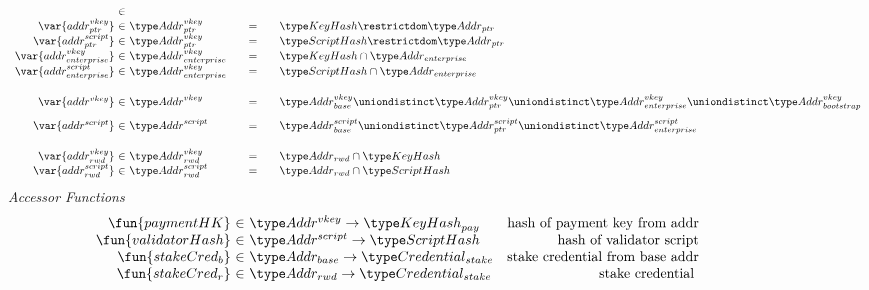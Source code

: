 \begin{figure*}[hbt]
\begin{equation*}
\begin{array}{r@{~\in~}l@{\qquad=\qquad}lr}
      \\
      \var{addr^{vkey}_{ptr}}
                 & \Addr^{vkey}_{ptr}
                               & \KeyHash\restrictdom\Addr_{ptr}
      \\
      \var{addr^{script}_{ptr}}
                 & \Addr^{vkey}_{ptr}
                               & \HashScr\restrictdom\Addr_{ptr}
      \\
      \var{addr^{vkey}_{enterprise}}
                 & \Addr^{vkey}_{enterprise}
                               & \KeyHash\cap\Addr_{enterprise}
      \\
      \var{addr^{script}_{enterprise}}
                 & \Addr^{vkey}_{enterprise}
                               & \HashScr\cap\Addr_{enterprise}
      \\[0.5cm]
      \var{addr^{vkey}} &
             \Addr^{vkey} &
                            \Addr^{vkey}_{base} \uniondistinct \Addr^{vkey}_{ptr} \uniondistinct \Addr^{vkey}_{enterprise} \uniondistinct \Addr^{vkey}_{bootstrap}\\[0.3cm]
      \var{addr^{script}} &
                            \Addr^{script} &
                                             \Addr^{script}_{base}
                                             \uniondistinct \Addr^{script}_{ptr}
                                             \uniondistinct
                                             \Addr^{script}_{enterprise}
      \\[0.5cm]
      \var{addr_{rwd}^{vkey}} & \Addr_{rwd}^{vkey} & \Addr_{rwd}\cap\KeyHash \\
      \var{addr_{rwd}^{script}} & \Addr_{rwd}^{script} & \Addr_{rwd}\cap\HashScr \\
    \end{array}
  \end{equation*}
  \emph{Accessor Functions}
  \begin{equation*}
    \begin{array}{r@{~\in~}lr}
      \fun{paymentHK} & \AddrVKey \to \KeyHash_{pay}
      & \text{hash of payment key from addr}\\
      \fun{validatorHash} & \AddrScr \to \HashScr & \text{hash of validator
                                                    script} \\
            \fun{stakeCred_{b}} & \AddrB \to
                          \StakeCredential & \text{stake credential from base
                                      addr}\\
      \fun{stakeCred_{r}} & \AddrRWD \to \StakeCredential & \text{stake credential
}
\end{array}
\end{equation*}
\end{figure*}

